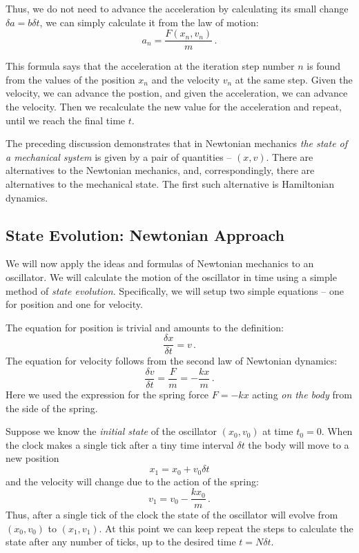 Thus, we do not need to advance the acceleration by calculating its
small change $\delta a=b\delta t$, we can simply calculate it from
the law of motion:
\begin{equation}
	a_{n}=\frac{F(x_{n},v_{n})}{m}\,.
\end{equation}

This formula says that the acceleration at the iteration step number
$n$ is found from the values of the position $x_{n}$ and the velocity
$v_{n}$ at the same step. Given the velocity, we can advance the
postion, and given the acceleration, we can advance the velocity.
Then we recalculate the new value for the acceleration and repeat,
until we reach the final time $t$.

The preceding discussion demonstrates that in Newtonian mechanics
\emph{the state of a mechanical system} is given by a pair of quantities
-- $(x,v)$. There are alternatives to the Newtonian mechanics, and,
correspondingly, there are alternatives to the mechanical state. The
first such alternative is Hamiltonian dynamics.

\subsection{State Evolution: Newtonian Approach}
We will now apply the ideas and formulas of Newtonian mechanics to an
oscillator. We will calculate the motion of the oscillator in time
using a simple method of \emph{state evolution}. Specifically, we will
setup two simple equations -- one for position and one for velocity.

The equation for position is trivial and amounts to the definition:
\[
\frac{\delta x}{\delta t} = v\,.
\]
The equation for velocity follows from the second law of Newtonian
dynamics:
\[
\frac{\delta v}{\delta t} = \frac{F}{m} = -\frac{kx}{m}\,.
\]
Here we used the expression for the spring force $F=-kx$ acting
\emph{on the body} from the side of the spring.

Suppose we know the \emph{initial state} of the oscillator
$(x_0, v_0)$ at time $t_0=0$. When the clock makes a single tick after
a tiny time interval $\delta t$ the body will move to a new position
\[
x_1 = x_0 + v_0\delta t
\]
and the velocity will change due to the action of the spring:
\[
v_1 = v_0 -\frac{kx_0}{m}\,.
\]
Thus, after a single tick of the clock the state of the oscillator
will evolve from $(x_0, v_0)$ to $(x_1, v_1)$. At this point we can
keep repeat the steps to calculate the state after any number of
ticks, up to the desired time $t=N\delta t$.

